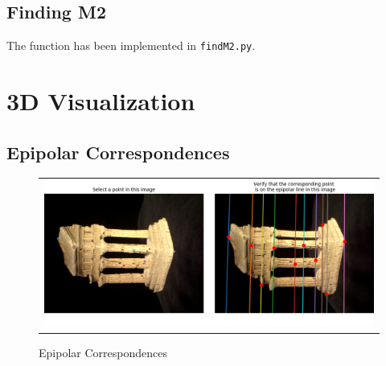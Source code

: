 \documentclass[a4paper]{article}
\begin{document}
\subsection{Finding M2}
The function has been implemented in \texttt{findM2.py}.

\section{3D Visualization}
\subsection{Epipolar Correspondences}
\begin{figure}[!ht]
\centering
\begin{tabular}{c}
{\includegraphics[width=\textwidth]{images/correspondences.png}}
\end{tabular}
\caption{Epipolar Correspondences}
\end{figure}
\end{document}
